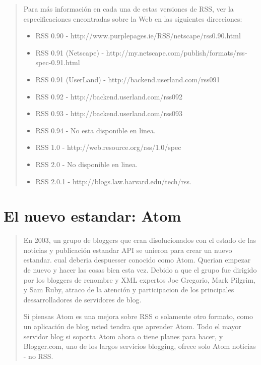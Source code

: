 \blockquote{

Para más información en cada una de estas versiones de RSS, ver la especificaciones encontradas sobre la Web 
en las siguientes direcciones:

\begin{itemize}

\item RSS 0.90 - http://www.purplepages.ie/RSS/netscape/rss0.90.html
\item RSS 0.91 (Netscape) - http://my.netscape.com/publish/formats/rss-spec-0.91.html
\item RSS 0.91 (UserLand) - http://backend.userland.com/rss091
\item RSS 0.92 - http://backend.userland.com/rss092
\item RSS 0.93 - http://backend.userland.com/rss093
\item RSS 0.94 - No esta disponible en linea.
\item RSS 1.0 - http://web.resource.org/rss/1.0/spec
\item RSS 2.0 - No disponible en linea.
\item RSS 2.0.1 - http://blogs.law.harvard.edu/tech/rss.\cite{johnson2006rss}

\end{itemize}

}

\normalsize

\section{El nuevo estandar: Atom}

\scriptsize

\blockquote{
En 2003, un grupo de bloggers que eran disolucionados con el estado de las noticias y publicación estandar API
se unieron para crear un nuevo estandar. cual deberia despuesser conocido como Atom. Querian empezar de nuevo y
hacer las cosas bien esta vez. Debido a que el grupo fue dirigido por los bloggers de renombre y XML expertos
Joe Gregorio, Mark Pilgrim, y Sam Ruby, atraco de la atención y participacion de los principales dessarrolladores
de servidores de blog.

Si piensas Atom es una mejora sobre RSS o solamente otro formato, como un aplicación de blog usted 
tendra que aprender Atom. Todo el mayor servidor blog si soporta Atom ahora o tiene planes para hacer, y Blogger.com,
uno de los largos servicios blogging, ofrece solo Atom noticias - no RSS.\cite{johnson2006rss}
}
\normalsize

